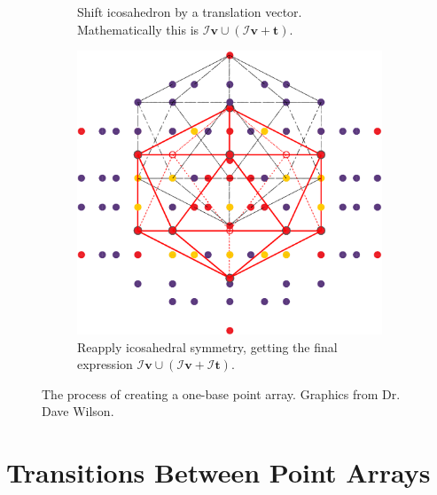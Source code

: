 \documentclass[a4paper,10pt]{article}
\theoremstyle{plain}
\theoremstyle{definition}
\theoremstyle{remark}
\renewcommand{\vec}[1]{\mathbf{#1}}
\begin{document}
\begin{figure}[h!]
\begin{subfigure}{0.3\textwidth}
		\caption{Shift icosahedron by a translation vector. Mathematically this is \mbox{\(\mathcal{I}\vec{v} \cup (\mathcal{I}\vec{v} + \vec{t})\)}.}
	\end{subfigure}
	\hfill
	\begin{subfigure}{0.35\textwidth}
		\centering
		\includegraphics[width=\textwidth]{images/p_arr_construction_3.pdf}
		\caption{Reapply icosahedral symmetry, getting the final expression \(\mathcal{I}\vec{v} \cup (\mathcal{I}\vec{v} + \mathcal{I}\vec{t})\).}
	\end{subfigure}
	\caption{The process of creating a one-base point array. Graphics from Dr. Dave Wilson.}
	\label{fig:point_array_construction}
\end{figure}

\section{Transitions Between Point Arrays}
\end{document}
